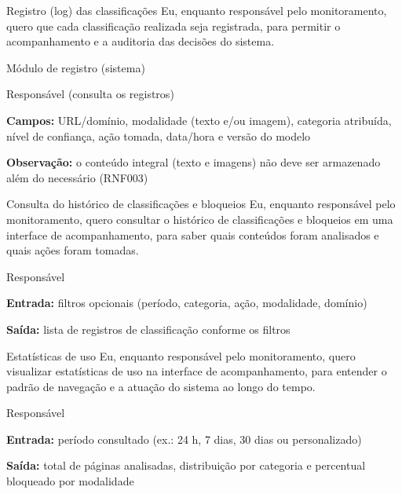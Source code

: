 \documentclass[
    12pt,           %
    oneside,        %
    a4paper,        %
    chapter=TITLE,  %
    english,        %
    brazil          %
]{abntex2}
\begin{document}
{Registro (log) das classificações}
{Eu, enquanto responsável pelo monitoramento, quero que cada classificação realizada seja registrada, para permitir o acompanhamento e a auditoria das decisões do sistema.}
{\begin{dadoslista}
\item Módulo de registro (sistema)
\item Responsável (consulta os registros)
\end{dadoslista}}
{\begin{dadoslista}
\item \textbf{Campos:} URL/domínio, modalidade (texto e/ou imagem), categoria atribuída, nível de confiança, ação tomada, data/hora e versão do modelo
\item \textbf{Observação:} o conteúdo integral (texto e imagens) não deve ser armazenado além do necessário (RNF003)
\end{dadoslista}}

{Consulta do histórico de classificações e bloqueios}
{Eu, enquanto responsável pelo monitoramento, quero consultar o histórico de classificações e bloqueios em uma interface de acompanhamento, para saber quais conteúdos foram analisados e quais ações foram tomadas.}
{\begin{dadoslista}
\item Responsável
\end{dadoslista}}
{\begin{dadoslista}
\item \textbf{Entrada:} filtros opcionais (período, categoria, ação, modalidade, domínio)
\item \textbf{Saída:} lista de registros de classificação conforme os filtros
\end{dadoslista}}

{Estatísticas de uso}
{Eu, enquanto responsável pelo monitoramento, quero visualizar estatísticas de uso na interface de acompanhamento, para entender o padrão de navegação e a atuação do sistema ao longo do tempo.}
{\begin{dadoslista}
\item Responsável
\end{dadoslista}}
{\begin{dadoslista}
\item \textbf{Entrada:} período consultado (ex.: 24 h, 7 dias, 30 dias ou personalizado)
\item \textbf{Saída:} total de páginas analisadas, distribuição por categoria e percentual bloqueado por modalidade
\end{dadoslista}}
\end{document}
